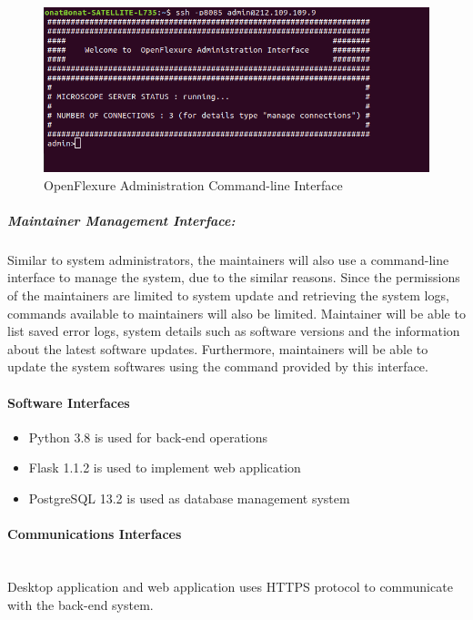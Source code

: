 \begin{figure}[H]
	\centering
	\includegraphics[scale=0.5]{Figures/admin_interface}
	\caption{OpenFlexure Administration Command-line Interface}
	\label{fig:system_admin_management_interface}
\end{figure}
\subparagraph{Maintainer Management Interface:} Similar to system administrators, the maintainers will also use a command-line interface to manage the system, due to the similar reasons. Since the permissions of the maintainers are limited to system update and retrieving the system logs, commands available to maintainers will also be limited. Maintainer will be able to list saved error logs, system details such as software versions and the information about the latest software updates. Furthermore, maintainers will be able to update the system softwares using the command provided by this interface.

\paragraph{Software Interfaces}
\begin{itemize}
	\item Python 3.8 is used for back-end operations
	\item Flask 1.1.2 is used to implement web application
	\item PostgreSQL 13.2 is used as database management system
\end{itemize}

\paragraph{Communications Interfaces}\mbox{}\\
Desktop application and web application uses HTTPS protocol to communicate with the back-end system.

